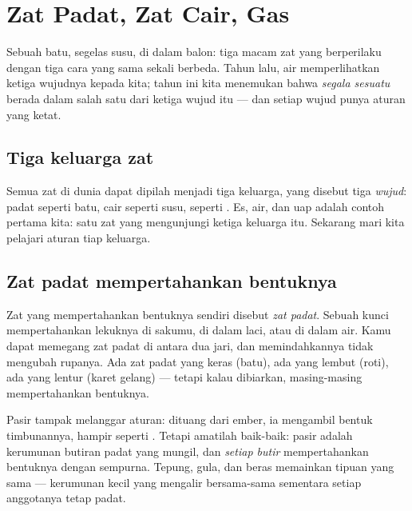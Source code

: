 \chapter{Zat Padat, Zat Cair, Gas}\label{ch:g3:solids-liquids-gases}

Sebuah batu, segelas susu,  di dalam balon: tiga macam zat yang
berperilaku dengan tiga cara yang sama sekali berbeda. Tahun lalu, air
memperlihatkan ketiga wujudnya kepada kita; tahun ini kita menemukan
bahwa \emph{segala sesuatu} berada dalam salah satu dari ketiga wujud
itu --- dan setiap wujud punya aturan yang ketat.

\section{Tiga keluarga zat}

Semua zat di dunia dapat dipilah menjadi tiga keluarga, yang disebut
tiga \emph{wujud}: padat seperti batu, cair seperti susu,  seperti
. Es, air, dan uap adalah contoh pertama kita: satu zat yang
mengunjungi ketiga keluarga itu. Sekarang mari kita pelajari aturan
tiap keluarga.

\section{Zat padat mempertahankan bentuknya}

\begin{definition}\label{def:g3:solids-liquids-gases:solid}
Zat yang mempertahankan bentuknya sendiri disebut
\emph{zat padat}. Sebuah kunci mempertahankan
lekuknya di sakumu, di dalam laci, atau di dalam air. Kamu dapat
memegang zat padat di antara dua jari, dan memindahkannya tidak
mengubah rupanya. Ada zat padat yang keras (batu), ada yang lembut
(roti), ada yang lentur (karet gelang) --- tetapi kalau dibiarkan,
masing-masing mempertahankan bentuknya.
\end{definition}

\begin{example}\label{ex:g3:solids-liquids-gases:sand}
Pasir tampak melanggar aturan: dituang dari ember, ia mengambil bentuk
timbunannya, hampir seperti . Tetapi amatilah baik-baik: pasir
adalah kerumunan butiran padat yang mungil, dan \emph{setiap butir}
mempertahankan bentuknya dengan sempurna. Tepung, gula, dan beras
memainkan tipuan yang sama --- kerumunan  kecil yang mengalir
bersama-sama sementara setiap anggotanya tetap padat.
\end{example}


